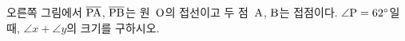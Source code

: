 \noindent\begin{minipage}[t]{0.58\linewidth}\vspace{0pt}\raggedright 오른쪽 그림에서 $\overline{\mathrm{PA}}$, $\overline{\mathrm{PB}}$는 원~$\mathrm{O}$의 접선이고 두 점~$\mathrm{A}$, $\mathrm{B}$는 접점이다. $\angle\mathrm{P}=62^\circ$일 때, $\angle x+\angle y$의 크기를 구하시오.\end{minipage}\hfill\begin{minipage}[t]{0.4\linewidth}\vspace{0pt}\centering \resizebox{\ifdim\width>\linewidth\linewidth\else\width\fi}{!}{}\end{minipage}\par
